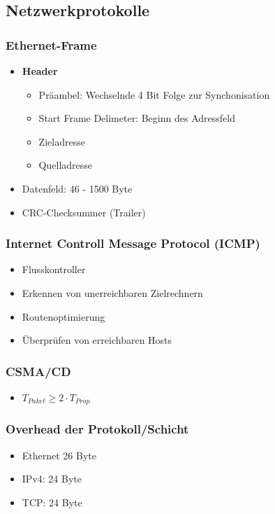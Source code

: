 \subsection{Netzwerkprotokolle}

\subsubsection{Ethernet-Frame}
\begin{itemize}
	\item \textbf{Header}
	\begin{itemize}
		\item Präambel: Wechselnde 4 Bit Folge zur Synchonisation
		\item Start Frame Delimeter: Beginn des Adressfeld
		\item Zieladresse
		\item Quelladresse
	\end{itemize}
	\item Datenfeld: 46 - 1500 Byte
	\item CRC-Checksummer (Trailer)
\end{itemize}

\subsubsection{Internet Controll Message Protocol (ICMP)}
\begin{itemize}
	\item Flusskontroller
	\item Erkennen von unerreichbaren Zielrechnern
	\item Routenoptimierung
	\item Überprüfen von erreichbaren Hosts
\end{itemize}

\subsubsection{CSMA/CD}
\begin{itemize}
	\item \(T_{Paket} \ge 2 \cdot T_{Prop}\)
\end{itemize}

\subsubsection{Overhead der Protokoll/Schicht}
\begin{itemize}
	\item Ethernet 26 Byte
	\item IPv4: 24 Byte
	\item TCP: 24 Byte
\end{itemize}


